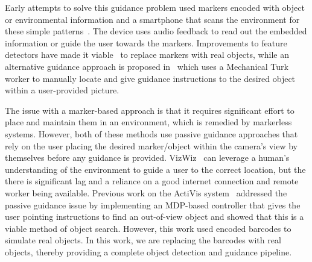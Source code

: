 \documentclass[runningheads]{llncs}
\begin{document}
Early attempts to solve this guidance problem used markers encoded with object or environmental information and a smartphone that scans the environment for these simple patterns~\cite{gude2013blind,manduchi2012mobile}. 
The device uses audio feedback to read out the embedded information or guide the user towards the markers. 
Improvements to feature detectors have made it viable~\cite{redmon2016you,huang2017speed} to replace markers with real objects, while an alternative guidance approach is proposed in~\cite{bigham2010vizwiz} which uses a Mechanical Turk worker to manually locate and give guidance instructions to the desired object within a user-provided picture. 

The issue with a marker-based approach is that it requires significant effort to place and maintain them in an environment, which is remedied by markerless systems.
However, both of these methods use passive guidance approaches that rely on the user placing the desired marker/object within the camera's view by themselves before any guidance is provided. 
VizWiz~\cite{bigham2010vizwiz} can leverage a human's understanding of the environment to guide a user to the correct location, but the there is significant lag and a reliance on a good internet connection and remote worker being available. 
Previous work on the ActiVis system~\cite{lock2019active} addressed the passive guidance issue by implementing an MDP-based controller that gives the user pointing instructions to find an out-of-view object and showed that this is a viable method of object search. 
However, this work used encoded barcodes to simulate real objects.
In this work, we are replacing the barcodes with real objects, thereby providing a complete object detection and guidance pipeline. 
\end{document}
